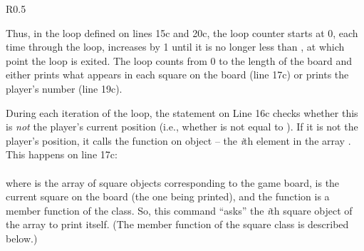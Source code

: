 \begin{wrapfigure}{R}{0.5\textwidth} 
\vspace{-0.5cm}
\end{wrapfigure}

Thus, in the loop defined on lines 15c and 20c, the loop counter  starts at 0, each time through the  loop,  increases by 1 until it is no longer less than , at which point the loop is exited.  The  loop counts from 0 to the length of the board and either prints what appears in each square on the board (line 17c) or prints the player's number (line 19c).

During each iteration of the loop, the  statement on Line 16c checks whether this is \emph{not} the player's current position (i.e., whether  is not equal to ).  If it is not the player's position, it calls the  function on object  -- the \emph{i}th element in the array .  This happens on line 17c:\\
\\
where  is the array of square objects corresponding to the game board,  is the current square on the board (the one being printed), and the  function is a member function of the  class.  So, this command ``asks'' the \emph{i}th square object of the array  to print itself.  (The  member function of the square class is described below.)

